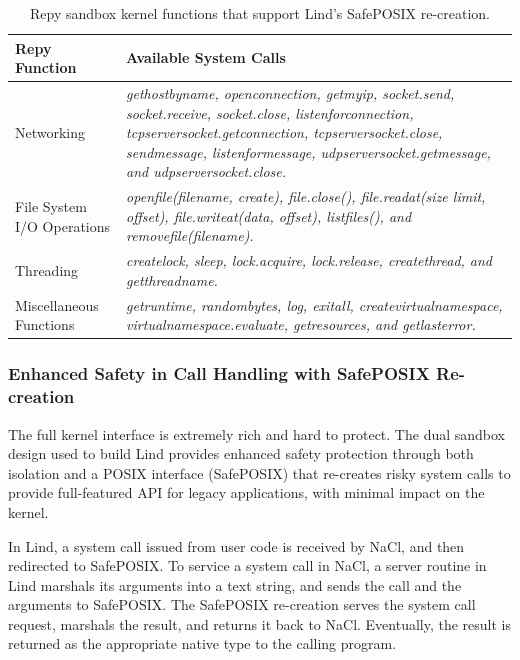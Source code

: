 \begin{table}
\centering
  \begin{tabular}{ | p{2.5cm} | p{4.5cm} |}
  \hline
  \textbf{Repy Function} & \textbf{Available System Calls}  \\ \hline

Networking & \emph{gethostbyname, openconnection, getmyip, socket.send, socket.receive, socket.close,
listenforconnection, tcpserversocket.getconnection, tcpserversocket.close, sendmessage, listenformessage,
udpserversocket.getmessage, and udpserversocket.close.} \\ \hline

File System I/O Operations & \emph{openfile(filename, create), file.close(), file.readat(size limit, offset), file.writeat(data, offset),
listfiles(), and removefile(filename).} \\ \hline

Threading & \emph{createlock, sleep, lock.acquire, lock.release, createthread, and getthreadname.} \\ \hline

Miscellaneous Functions & \emph{getruntime, randombytes, log, exitall, createvirtualnamespace,
virtualnamespace.evaluate, getresources, and getlasterror.}  \\ \hline
    \end{tabular}
    \caption{Repy sandbox kernel functions that support Lind's SafePOSIX re-creation.}
    \label{table:RepyKernel}
\end{table}


\subsubsection{Enhanced Safety in Call Handling with SafePOSIX Re-creation}

The full kernel interface is extremely rich and hard to protect.
The dual sandbox \lip design used to build Lind provides enhanced
safety protection through both isolation and a POSIX interface (SafePOSIX) that
re-creates risky system calls to
provide full-featured API for legacy applications, with minimal impact on the kernel.

In Lind, a system call issued from user code is
received by NaCl, and then redirected to SafePOSIX.
To service a system call in NaCl, a server routine in
Lind marshals its arguments into a text string, and sends the call and the arguments
to SafePOSIX. The SafePOSIX re-creation serves the system call request, marshals the result, and
returns it back to NaCl. Eventually, the result is returned as the appropriate
native type to the calling program.

